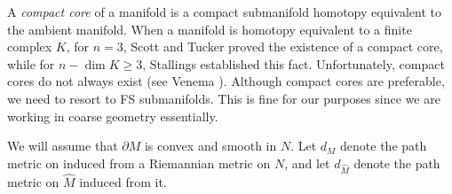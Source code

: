 
A \emph{compact core} of a manifold is a compact submanifold homotopy equivalent to the ambient manifold. 
When a manifold is homotopy equivalent to a finite complex $K$, for $n=3$, Scott and Tucker \cite{ST89} proved the existence of a compact core, while for $n - \dim K \geq 3$, Stallings \cite{Stallings65} established this fact. Unfortunately, compact cores do not always exist (see Venema \cite{Venema80}). 
Although compact cores are preferable, we need to resort to FS submanifolds. This is fine for our purposes since we are working in coarse geometry essentially. 



We will assume that $\partial M$ is convex and smooth in $N$. Let $d_M$ denote the path metric on  induced from a Riemannian metric on $N$, and let $d_{\hat{M}}$ denote the path metric on $\hat{M}$ induced from it.

